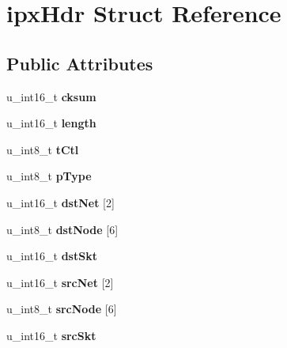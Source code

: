 \hypertarget{structipx_hdr}{
\section{ipxHdr Struct Reference}
\label{structipx_hdr}
}
\subsection*{Public Attributes}
\begin{DoxyCompactItemize}
\item 
\hypertarget{structipx_hdr_ab1a062e9c3052d73c60ee1aeba97e702}{
u\_\-int16\_\-t {\bfseries cksum}}
\label{structipx_hdr_ab1a062e9c3052d73c60ee1aeba97e702}

\item 
\hypertarget{structipx_hdr_aa70e722643f0e73b7cf7d970330fe951}{
u\_\-int16\_\-t {\bfseries length}}
\label{structipx_hdr_aa70e722643f0e73b7cf7d970330fe951}

\item 
\hypertarget{structipx_hdr_aee6fe98c04cc94f0250c91f03a7607ef}{
u\_\-int8\_\-t {\bfseries tCtl}}
\label{structipx_hdr_aee6fe98c04cc94f0250c91f03a7607ef}

\item 
\hypertarget{structipx_hdr_a83916f00919c6c3d224394d83882f90e}{
u\_\-int8\_\-t {\bfseries pType}}
\label{structipx_hdr_a83916f00919c6c3d224394d83882f90e}

\item 
\hypertarget{structipx_hdr_ae69f03be707c61a4b7b20491b660c78e}{
u\_\-int16\_\-t {\bfseries dstNet} \mbox{[}2\mbox{]}}
\label{structipx_hdr_ae69f03be707c61a4b7b20491b660c78e}

\item 
\hypertarget{structipx_hdr_afac0da207df7b91354f0a42966e0cd3d}{
u\_\-int8\_\-t {\bfseries dstNode} \mbox{[}6\mbox{]}}
\label{structipx_hdr_afac0da207df7b91354f0a42966e0cd3d}

\item 
\hypertarget{structipx_hdr_afdca7160a5ae4eeac314b75670d6b5f2}{
u\_\-int16\_\-t {\bfseries dstSkt}}
\label{structipx_hdr_afdca7160a5ae4eeac314b75670d6b5f2}

\item 
\hypertarget{structipx_hdr_a0fb3632c4e1c076cf2325427e01bd34e}{
u\_\-int16\_\-t {\bfseries srcNet} \mbox{[}2\mbox{]}}
\label{structipx_hdr_a0fb3632c4e1c076cf2325427e01bd34e}

\item 
\hypertarget{structipx_hdr_abe91aff91068c0c4e74906623c7292cb}{
u\_\-int8\_\-t {\bfseries srcNode} \mbox{[}6\mbox{]}}
\label{structipx_hdr_abe91aff91068c0c4e74906623c7292cb}

\item 
\hypertarget{structipx_hdr_ac5ccdb9b6743c343483bd715cfd76999}{
u\_\-int16\_\-t {\bfseries srcSkt}}
\label{structipx_hdr_ac5ccdb9b6743c343483bd715cfd76999}

\end{DoxyCompactItemize}


